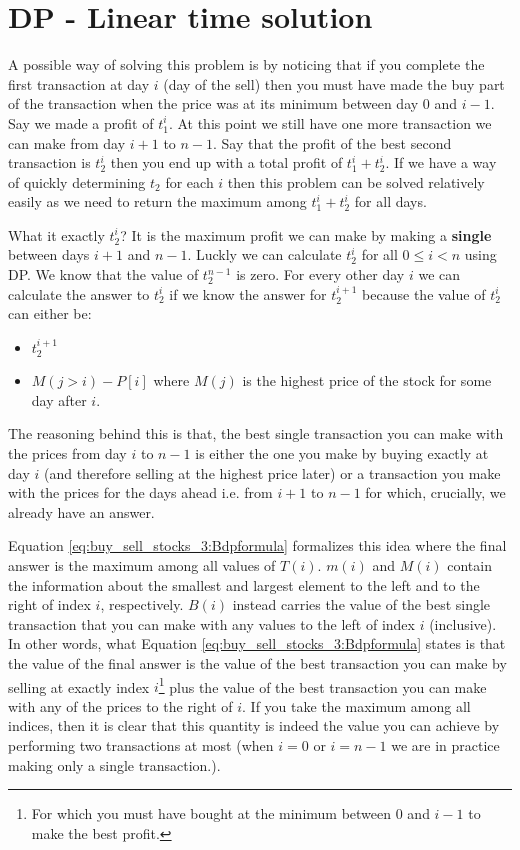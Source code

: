 \section{DP - Linear time solution}
\label{buy_sell_stocks_3:sec:linear}
A possible way of solving this problem is by noticing that if you complete the first transaction at day $i$ (day of the sell) then
you must have made the buy part of the transaction when the price was at its minimum between day $0$ and $i-1$. Say we made a profit of $t^i_1$.
At this point we still have one more transaction we can make from day $i+1$ to $n-1$. Say that the profit of the best second transaction is $t^i_2$ then you end up with a total profit of $t^i_1+t^i_2$. If we have a way of quickly determining $t_2$ for each $i$ then this problem can be solved relatively easily as we need to return the maximum among $t^i_1+t^i_2$ for all days.

What it exactly $t^i_2$? It is the maximum profit we can make by making a \textbf{single} between days $i+1$ and $n-1$. 
Luckly we can calculate $t^i_2$ for all $0 \leq i < n$ using DP. We know that the value of $t^{n-1}_2$ is zero. For every other day $i$ 
we can calculate the answer to $t^i_2$ if we know the answer for $t^{i+1}_2$ because  the value of $t^i_2$ can either be:
\begin{itemize}
	\item $t^{i+1}_2$ 
	\item $M(j > i)-P[i]$ where $M(j)$ is the highest price of the stock for some day after $i$.
\end{itemize}
The reasoning behind this is that, the best single transaction you can make with the prices from day $i$ to $n-1$ is either the one you make by buying exactly at day $i$ (and therefore selling at the highest price later) or a transaction you make with the prices for the days ahead i.e. from $i+1$ to $n-1$ for which, crucially, we already have an answer. 


Equation \ref{eq:buy_sell_stocks_3:Bdpformula} formalizes this idea where the final answer is the maximum among all values of $T(i)$.
$m(i)$ and $M(i)$ contain the information about the smallest and largest element to the left and to the right of index $i$, respectively.
$B(i)$ instead carries the value of the best single transaction that you can make with any values to the left of index $i$ (inclusive).
In other words, what Equation \ref{eq:buy_sell_stocks_3:Bdpformula} states is that the value of the final answer is the value of the best transaction you can make by selling at exactly index $i$\footnote{For which you must have bought at the minimum between $0$ and $i-1$ to make the best profit.} 
plus the value of the best transaction you can make with any of the prices to the right of $i$.
If you take the maximum among all indices, then it is clear that this quantity is indeed the value you can achieve by performing two transactions at most (when $i=0$ or $i=n-1$ we are in practice making only a single transaction.).

